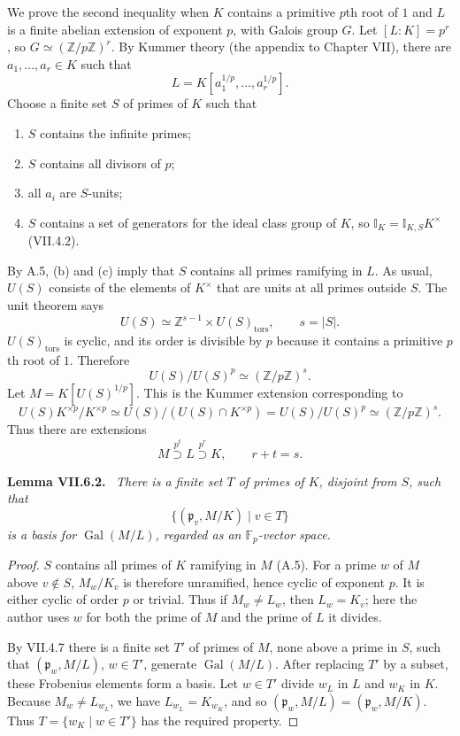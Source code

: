 \documentclass[11pt]{article}
\newcommand{\I}{\mathbb I}
\newcommand{\Gal}{\operatorname{Gal}}
\newenvironment{authorresult}[2]{\par\medskip\noindent\textbf{#1 VII.#2.}\ \itshape}{\par\medskip}
\begin{document}
We prove the second inequality when $K$ contains a primitive $p$th root of
$1$ and $L$ is a finite abelian extension of exponent $p$, with Galois group
$G$. Let $[L:K]=p^r$, so $G\simeq(\mathbb Z/p\mathbb Z)^r$.
By Kummer theory (the appendix to Chapter VII), there are $a_1,\ldots,a_r\in K$
such that
\[
 L=K[a_1^{1/p},\ldots,a_r^{1/p}].
\]
Choose a finite set $S$ of primes of $K$ such that
\begin{enumerate}
\item[(a)] $S$ contains the infinite primes;
\item[(b)] $S$ contains all divisors of $p$;
\item[(c)] all $a_i$ are $S$-units;
\item[(d)] $S$ contains a set of generators for the ideal class group of $K$,
so $\I_K=\I_{K,S}K^\times$ (VII.4.2).
\end{enumerate}
By A.5, (b) and (c) imply that $S$ contains all primes ramifying in $L$.
As usual, $U(S)$ consists of the elements of $K^\times$ that are units at all
primes outside $S$. The unit theorem says
\[
 U(S)\simeq\mathbb Z^{s-1}\times U(S)_{\mathrm{tors}},\qquad s=|S|.
\]
$U(S)_{\mathrm{tors}}$ is cyclic, and its order is divisible by $p$ because
it contains a primitive $p$th root of $1$. Therefore
\[
 U(S)/U(S)^p\simeq(\mathbb Z/p\mathbb Z)^s.
\]
Let $M=K[U(S)^{1/p}]$. This is the Kummer extension corresponding to
\[
 U(S)K^{\times p}/K^{\times p}
 \simeq U(S)/(U(S)\cap K^{\times p})
 =U(S)/U(S)^p\simeq(\mathbb Z/p\mathbb Z)^s.
\]
Thus there are extensions
\[
 M\overset{p^t}{\supset}L\overset{p^r}{\supset}K,\qquad r+t=s.
\]

\begin{authorresult}{Lemma}{6.2}
There is a finite set $T$ of primes of $K$, disjoint from $S$, such that
\[
 \{(\mathfrak p_v,M/K)\mid v\in T\}
\]
is a basis for $\Gal(M/L)$, regarded as an $\mathbb F_p$-vector space.
\end{authorresult}
\begin{proof}
$S$ contains all primes of $K$ ramifying in $M$ (A.5). For a prime $w$ of
$M$ above $v\notin S$, $M_w/K_v$ is therefore unramified, hence cyclic of
exponent $p$. It is either cyclic of order $p$ or trivial. Thus if
$M_w\ne L_w$, then $L_w=K_v$; here the author uses $w$ for both the prime
of $M$ and the prime of $L$ it divides.

By VII.4.7 there is a finite set $T'$ of primes of $M$, none above a prime
in $S$, such that $(\mathfrak p_w,M/L)$, $w\in T'$, generate $\Gal(M/L)$.
After replacing $T'$ by a subset, these Frobenius elements form a basis.
Let $w\in T'$ divide $w_L$ in $L$ and $w_K$ in $K$. Because
$M_w\ne L_{w_L}$, we have $L_{w_L}=K_{w_K}$, and so
$(\mathfrak p_w,M/L)=(\mathfrak p_w,M/K)$.
Thus $T=\{w_K\mid w\in T'\}$ has the required property.
\end{proof}
\end{document}
